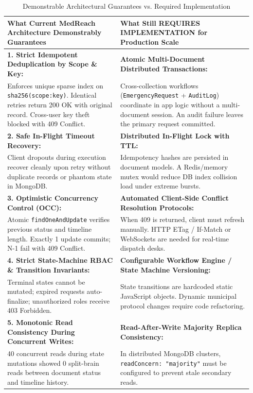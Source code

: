 \documentclass[conference]{IEEEtran}
\begin{document}
\begin{table}[t]
\caption{Demonstrable Architectural Guarantees vs. Required Implementation}
\label{tab:architectural_guarantees}
\centering
\begin{tabularx}{\linewidth}{X|X}
\toprule
\textbf{What Current MedReach Architecture Demonstrably Guarantees} & \textbf{What Still REQUIRES IMPLEMENTATION for Production Scale} \\
\midrule
\textbf{1. Strict Idempotent Deduplication by Scope \& Key:} & \textbf{Atomic Multi-Document Distributed Transactions:} \\
Enforces unique sparse index on \texttt{sha256(scope:key)}. Identical retries return 200 OK with original record. Cross-user key theft blocked with 409 Conflict. & Cross-collection workflows (\texttt{EmergencyRequest} + \texttt{AuditLog}) coordinate in app logic without a multi-document session. An audit failure leaves the primary request committed. \\
\midrule
\textbf{2. Safe In-Flight Timeout Recovery:} & \textbf{Distributed In-Flight Lock with TTL:} \\
Client dropouts during execution recover cleanly upon retry without duplicate records or phantom state in MongoDB. & Idempotency hashes are persisted in document models. A Redis/memory mutex would reduce DB index collision load under extreme bursts. \\
\midrule
\textbf{3. Optimistic Concurrency Control (OCC):} & \textbf{Automated Client-Side Conflict Resolution Protocols:} \\
Atomic \texttt{findOneAndUpdate} verifies previous status and timeline length. Exactly 1 update commits; N-1 fail with 409 Conflict. & When 409 is returned, client must refresh manually. HTTP ETag / If-Match or WebSockets are needed for real-time dispatch desks. \\
\midrule
\textbf{4. Strict State-Machine RBAC \& Transition Invariants:} & \textbf{Configurable Workflow Engine / State Machine Versioning:} \\
Terminal states cannot be mutated; expired requests auto-finalize; unauthorized roles receive 403 Forbidden. & State transitions are hardcoded static JavaScript objects. Dynamic municipal protocol changes require code refactoring. \\
\midrule
\textbf{5. Monotonic Read Consistency During Concurrent Writes:} & \textbf{Read-After-Write Majority Replica Consistency:} \\
40 concurrent reads during state mutations showed 0 split-brain reads between document status and timeline history. & In distributed MongoDB clusters, \texttt{readConcern: "majority"} must be configured to prevent stale secondary reads. \\

\end{tabularx}
\end{table}
\end{document}
